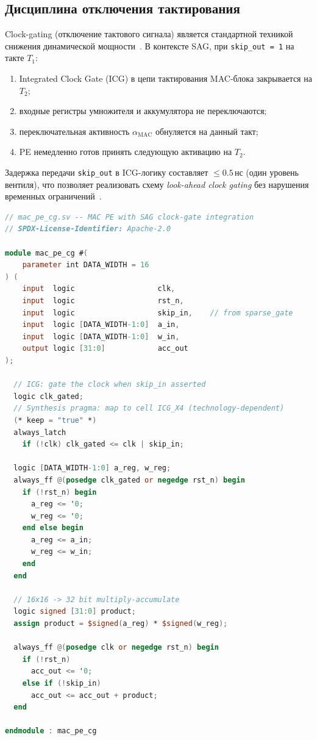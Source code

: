 \subsection{Дисциплина отключения тактирования}
\label{ssec:glava87-clock-gating}

Clock-gating (отключение тактового сигнала) является стандартной
техникой снижения динамической мощности~\cite{Weste-Harris-CMOS4}.
В контексте SAG, при \texttt{skip\_out = 1} на такте $T_1$:
\begin{enumerate}
  \item Integrated Clock Gate (ICG) в цепи тактирования MAC-блока
        закрывается на $T_2$;
  \item входные регистры умножителя и аккумулятора не переключаются;
  \item переключательная активность $\alpha_{\mathrm{MAC}}$ обнуляется
        на данный такт;
  \item PE немедленно готов принять следующую активацию на $T_2$.
\end{enumerate}

Задержка передачи \texttt{skip\_out} в ICG-логику составляет
$\leq 0{.}5\,\text{нс}$ (один уровень вентиля), что позволяет
реализовать схему \emph{look-ahead clock gating} без нарушения
временных ограничений~\cite{Hennessy-Patterson-CA6}.

\begin{lstlisting}[language=Verilog,
  caption={mac\_pe\_cg.sv — MAC PE с интегрированным clock-gate},
  label={lst:mac-pe-cg}]
// mac_pe_cg.sv -- MAC PE with SAG clock-gate integration
// SPDX-License-Identifier: Apache-2.0

module mac_pe_cg #(
    parameter int DATA_WIDTH = 16
) (
    input  logic                   clk,
    input  logic                   rst_n,
    input  logic                   skip_in,    // from sparse_gate
    input  logic [DATA_WIDTH-1:0]  a_in,
    input  logic [DATA_WIDTH-1:0]  w_in,
    output logic [31:0]            acc_out
);

  // ICG: gate the clock when skip_in asserted
  logic clk_gated;
  // Synthesis pragma: map to cell ICG_X4 (technology-dependent)
  (* keep = "true" *)
  always_latch
    if (!clk) clk_gated <= clk | skip_in;

  logic [DATA_WIDTH-1:0] a_reg, w_reg;
  always_ff @(posedge clk_gated or negedge rst_n) begin
    if (!rst_n) begin
      a_reg <= '0;
      w_reg <= '0;
    end else begin
      a_reg <= a_in;
      w_reg <= w_in;
    end
  end

  // 16x16 -> 32 bit multiply-accumulate
  logic signed [31:0] product;
  assign product = $signed(a_reg) * $signed(w_reg);

  always_ff @(posedge clk or negedge rst_n) begin
    if (!rst_n)
      acc_out <= '0;
    else if (!skip_in)
      acc_out <= acc_out + product;
  end

endmodule : mac_pe_cg
\end{lstlisting}

